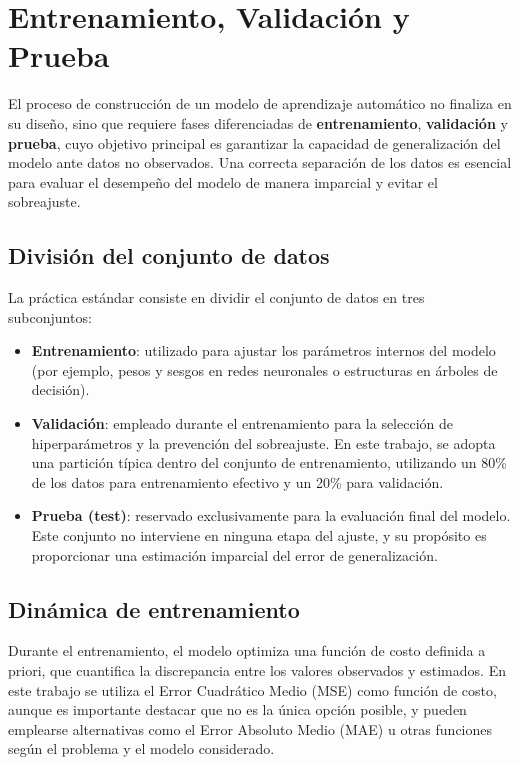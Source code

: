 \section{Entrenamiento, Validación y Prueba}

El proceso de construcción de un modelo de aprendizaje automático no finaliza en su diseño, sino que requiere fases diferenciadas de \textbf{entrenamiento}, \textbf{validación} y \textbf{prueba}, cuyo objetivo principal es garantizar la capacidad de generalización del modelo ante datos no observados. Una correcta separación de los datos es esencial para evaluar el desempeño del modelo de manera imparcial y evitar el sobreajuste.

\subsection*{División del conjunto de datos}

La práctica estándar consiste en dividir el conjunto de datos en tres subconjuntos:

\begin{itemize}
    \item \textbf{Entrenamiento}: utilizado para ajustar los parámetros internos del modelo (por ejemplo, pesos y sesgos en redes neuronales o estructuras en árboles de decisión).
    
    \item \textbf{Validación}: empleado durante el entrenamiento para la selección de hiperparámetros y la prevención del sobreajuste. En este trabajo, se adopta una partición típica dentro del conjunto de entrenamiento, utilizando un 80\% de los datos para entrenamiento efectivo y un 20\% para validación.
    
    \item \textbf{Prueba (test)}: reservado exclusivamente para la evaluación final del modelo. Este conjunto no interviene en ninguna etapa del ajuste, y su propósito es proporcionar una estimación imparcial del error de generalización.
\end{itemize}

\subsection*{Dinámica de entrenamiento}

Durante el entrenamiento, el modelo optimiza una función de costo definida a priori, que cuantifica la discrepancia entre los valores observados y estimados. En este trabajo se utiliza el Error Cuadrático Medio (MSE) como función de costo, aunque es importante destacar que no es la única opción posible, y pueden emplearse alternativas como el Error Absoluto Medio (MAE) u otras funciones según el problema y el modelo considerado.

